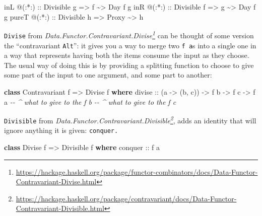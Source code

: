 \documentclass[]{article}
\newenvironment{Shaded}{}{}
\newcommand{\CommentTok}[1]{\textcolor[rgb]{0.38,0.63,0.69}{\textit{#1}}}
\newcommand{\DataTypeTok}[1]{\textcolor[rgb]{0.56,0.13,0.00}{#1}}
\newcommand{\KeywordTok}[1]{\textcolor[rgb]{0.00,0.44,0.13}{\textbf{#1}}}
\newcommand{\NormalTok}[1]{#1}
\newcommand{\OperatorTok}[1]{\textcolor[rgb]{0.40,0.40,0.40}{#1}}
\newcommand{\OtherTok}[1]{\textcolor[rgb]{0.00,0.44,0.13}{#1}}
\renewcommand{\href}[2]{#2\footnote{\url{#1}}}
\begin{document}
\begin{itemize}
\begin{Shaded}
\begin{Highlighting}[]
\NormalTok{inL   }\OperatorTok{@}\OtherTok{(:*:) ::} \DataTypeTok{Divisible}\NormalTok{ g }\OtherTok{=>}\NormalTok{ f     }\OperatorTok{\textasciitilde{}>} \DataTypeTok{Day}\NormalTok{ f g}
\NormalTok{inR   }\OperatorTok{@}\OtherTok{(:*:) ::} \DataTypeTok{Divisible}\NormalTok{ f }\OtherTok{=>}\NormalTok{ g     }\OperatorTok{\textasciitilde{}>} \DataTypeTok{Day}\NormalTok{ f g}
\NormalTok{pureT }\OperatorTok{@}\OtherTok{(:*:) ::} \DataTypeTok{Divisible}\NormalTok{ h }\OtherTok{=>} \DataTypeTok{Proxy} \OperatorTok{\textasciitilde{}>}\NormalTok{ h}
\end{Highlighting}
\end{Shaded}

  \texttt{Divise} from
  \emph{\href{https://hackage.haskell.org/package/functor-combinators/docs/Data-Functor-Contravariant-Divise.html}{Data.Functor.Contravariant.Divise}}
  can be thought of some version the ``contravariant \texttt{Alt}'': it gives
  you a way to merge two \texttt{f\ a}s into a single one in a way that
  represents having both the items consume the input as they choose. The usual
  way of doing this is by providing a splitting function to choose to give some
  part of the input to one argument, and some part to another:

\begin{Shaded}
\begin{Highlighting}[]
\KeywordTok{class} \DataTypeTok{Contravariant}\NormalTok{ f }\OtherTok{=>} \DataTypeTok{Divise}\NormalTok{ f }\KeywordTok{where}
\OtherTok{    divise ::}\NormalTok{ (a }\OtherTok{{-}>}\NormalTok{ (b, c)) }\OtherTok{{-}>}\NormalTok{ f b }\OtherTok{{-}>}\NormalTok{ f c }\OtherTok{{-}>}\NormalTok{ f a}
                  \CommentTok{{-}{-} \^{} what to give to the \textquotesingle{}f b\textquotesingle{}}
                     \CommentTok{{-}{-} \^{} what to give to the \textquotesingle{}f c\textquotesingle{}}
\end{Highlighting}
\end{Shaded}

  \texttt{Divisible} from
  \emph{\href{https://hackage.haskell.org/package/contravariant/docs/Data-Functor-Contravariant-Divisible.html}{Data.Functor.Contravariant.Divisible}},
  adds an identity that will ignore anything it is given: \texttt{conquer.}

\begin{Shaded}
\begin{Highlighting}[]
\KeywordTok{class} \DataTypeTok{Divise}\NormalTok{ f }\OtherTok{=>} \DataTypeTok{Divisible}\NormalTok{ f }\KeywordTok{where}
\OtherTok{    conquer ::}\NormalTok{ f a}
\end{Highlighting}
\end{Shaded}


\end{itemize}
\end{document}
